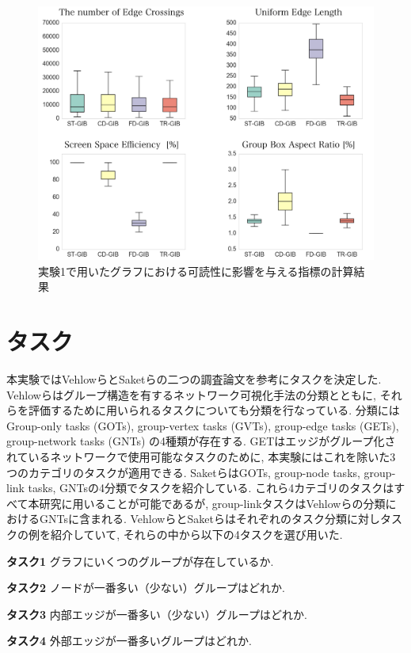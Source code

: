 \documentclass{kuee}
\begin{document}
\begin{figure}
  \centering
  \includegraphics[width=15cm]{./images/4sta.png}
  \caption{実験1で用いたグラフにおける可読性に影響を与える指標の計算結果 \label{fig:computation_4layout}}
\end{figure}


\section{タスク}
\label{sec:task_ex1}
本実験ではVehlowら\cite{Vehlow2017VisualizingGS}とSaketら\cite{saket2014group}の二つの調査論文を参考にタスクを決定した.
Vehlowらはグループ構造を有するネットワーク可視化手法の分類とともに, それらを評価するために用いられるタスクについても分類を行なっている.
分類にはGroup-only tasks (GOTs), group-vertex tasks (GVTs), group-edge tasks (GETs), group-network tasks (GNTs) の4種類が存在する.
GETはエッジがグループ化されているネットワークで使用可能なタスクのために, 本実験にはこれを除いた3つのカテゴリのタスクが適用できる.
SaketらはGOTs, group-node tasks, group-link tasks, GNTsの4分類でタスクを紹介している.
これら4カテゴリのタスクはすべて本研究に用いることが可能であるが, group-linkタスクはVehlowらの分類におけるGNTsに含まれる.
VehlowらとSaketらはそれぞれのタスク分類に対しタスクの例を紹介していて, それらの中から以下の4タスクを選び用いた.
\begin{description}
  \item {\bf タスク1} グラフにいくつのグループが存在しているか.
  \item {\bf タスク2} ノードが一番多い（少ない）グループはどれか.
  \item {\bf タスク3} 内部エッジが一番多い（少ない）グループはどれか.
  \item {\bf タスク4} 外部エッジが一番多いグループはどれか.
\end{description}
\end{document}
